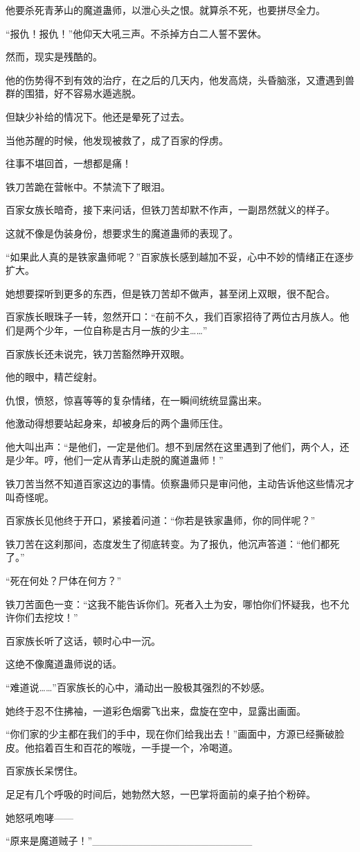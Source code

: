 \begin{this_body}
他要杀死青茅山的魔道蛊师，以泄心头之恨。就算杀不死，也要拼尽全力。

“报仇！报仇！”他仰天大吼三声。不杀掉方白二人誓不罢休。

然而，现实是残酷的。

他的伤势得不到有效的治疗，在之后的几天内，他发高烧，头昏脑涨，又遭遇到兽群的围猎，好不容易水遁逃脱。

但缺少补给的情况下。他还是晕死了过去。

当他苏醒的时候，他发现被救了，成了百家的俘虏。

往事不堪回首，一想都是痛！

铁刀苦跪在营帐中。不禁流下了眼泪。

百家女族长暗奇，接下来问话，但铁刀苦却默不作声，一副昂然就义的样子。

这就不像是伪装身份，想要求生的魔道蛊师的表现了。

“如果此人真的是铁家蛊师呢？”百家族长感到越加不妥，心中不妙的情绪正在逐步扩大。

她想要探听到更多的东西，但是铁刀苦却不做声，甚至闭上双眼，很不配合。

百家族长眼珠子一转，忽然开口：“在前不久，我们百家招待了两位古月族人。他们是两个少年，一位自称是古月一族的少主……”

百家族长还未说完，铁刀苦豁然睁开双眼。

他的眼中，精芒绽射。

仇恨，愤怒，惊喜等等的复杂情绪，在一瞬间统统显露出来。

他激动得想要站起身来，却被身后的两个蛊师压住。

他大叫出声：“是他们，一定是他们。想不到居然在这里遇到了他们，两个人，还是少年。哼，他们一定从青茅山走脱的魔道蛊师！”

铁刀苦当然不知道百家这边的事情。侦察蛊师只是审问他，主动告诉他这些情况才叫奇怪呢。

百家族长见他终于开口，紧接着问道：“你若是铁家蛊师，你的同伴呢？”

铁刀苦在这刹那间，态度发生了彻底转变。为了报仇，他沉声答道：“他们都死了。”

“死在何处？尸体在何方？”

铁刀苦面色一变：“这我不能告诉你们。死者入土为安，哪怕你们怀疑我，也不允许你们去挖坟！”

百家族长听了这话，顿时心中一沉。

这绝不像魔道蛊师说的话。

“难道说……”百家族长的心中，涌动出一股极其强烈的不妙感。

她终于忍不住拂袖，一道彩色烟雾飞出来，盘旋在空中，显露出画面。

“你们家的少主都在我们的手中，现在你们给我出去！”画面中，方源已经撕破脸皮。他掐着百生和百花的喉咙，一手提一个，冷喝道。

百家族长呆愣住。

足足有几个呼吸的时间后，她勃然大怒，一巴掌将面前的桌子拍个粉碎。

她怒吼咆哮——

“原来是魔道贼子！”\_\_\_\_\_\_\_\_\_\_\_\_\_\_\_\_\_\_\_\_\_\_

\end{this_body}

